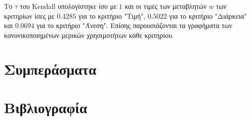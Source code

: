 \documentclass[11pt,a4paper,titlepage]{article}
\numberwithin{equation}{section}
\begin{document}
Το $τ$ του Kendall υπολογίστηκε ίσο με $1$ και οι τιμές των μεταβλητών $w$ των κριτηρίων ίσες με $0.4285$ για το κριτήριο "Τιμή", $0.5022$ για το κριτήριο "Διάρκεια" και $0.0694$ για το κριτήριο "Άνεση". Επίσης παρουσιάζονται τα γραφήματα των κανονικοποιημένων μερικών χρησιμοτήτων κάθε κριτηρίου. 

\section{Συμπεράσματα}
\label{sec:conclusion}





\section{Βιβλιογραφία}
\label{sec:bibliography}
\nocite{utastar-lecture}
\printbibliography
\end{document}
